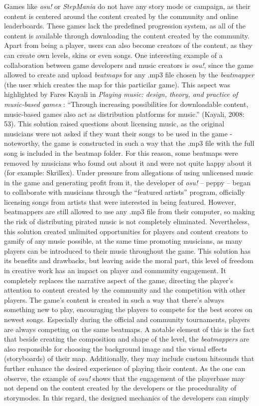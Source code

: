 Games like \textit{osu!} or \textit{StepMania} do not have any story mode or campaign, as their content is centered around the content created by the community and online leaderboards. These games lack the predefined progression system, as all of the content is available through downloading the content created by the community. Apart from being a player, users can also become creators of the content, as they can create own levels, skins or even songs. One interesting example of a collaboration between game developers and music creators is \textit{osu!}, since the game allowed to create and upload \textit{beatmaps} for any .mp3 file chosen by the \textit{beatmapper} (the user which creates the map for this particilar game). This aspect was highlighted by Fares Kayali in \textit{Playing music: design, theory, and practice of music-based games} \cite{faresplayingmusic}: “Through increasing possibilities for downloadable content, music-based games also act as distribution platforms for music.” (Kayali, 2008: 53). This solution raised questions about licensing music, as the original musicians were not asked if they want their songs to be used in the game - noteworthy, the game is constructed in such a way that the .mp3 file with the full song is included in the beatmap folder. For this reason, some beatmaps were removed by musicians who found out about it and were not quite happy about it (for example: Skrillex). Under pressure from allegations of using unlicensed music in the game and generating profit from it, the developer of \textit{osu!} -- peppy -- began to collaborate with musicians through the “featured artists” program, officially licensing songs from artists that were interested in being featured. However, beatmappers are still allowed to use any .mp3 file from their computer, so making the risk of distributing pirated music is not completely eliminated. Nevertheless, this solution created unlimited opportunities for players and content creators to gamify of any music possible, at the same time promoting musicians, as many players can be introduced to their music throughout the game. This solution has its benefits and drawbacks, but leaving aside the moral part, this level of freedom in creative work has an impact on player and community engagement. It completely replaces the narrative aspect of the game, directing the player’s attention to content created by the community and the competition with other players. The game’s content is created in such a way that there’s always something new to play, encouraging the players to compete for the best scores on newest songs. Especially during the official and community tournaments, players are always competing on the same beatmaps. A notable element of this is the fact that beside creating the composition and shape of the level, the \textit{beatmappers} are also responsible for choosing the background image and the visual effects (storyboards) of their map. Additionally, they may include custom hitsounds that further enhance the desired experience of playing their content. As the one can observe, the example of \textit{osu!} shows that the engagement of the playerbase may not depend on the content created by the developers or the procedurality of storymodes. In this regard, the designed mechanics of the developers can simply 